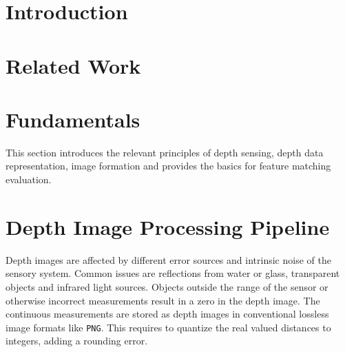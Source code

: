 \documentclass[numbers=noenddot,doktyp=marbeit,fontsize=12pt,sprache=english,hausschrift=true,draft=false]{TUBAFarbeiten}
\begin{document}
\maketitle
\TUBAFErklaerungsseite%

\setcounter{page}{1}

\newpage

\tableofcontents
\newpage



\newpage
{}\listoftables

\newpage
{}\listoffigures

\newpage
{}

\section{Introduction}\label{sec:introduction}

\newpage

\section{Related Work}\label{sec:related_work}

\newpage

\section{Fundamentals}\label{sec:fundamentals}

This section introduces the relevant principles of depth sensing, depth data representation, image formation and provides the basics for feature matching evaluation.






\newpage

\section{Depth Image Processing Pipeline}\label{sec:image_processing}

Depth images are affected by different error sources and intrinsic noise of the sensory system.
Common issues are reflections from water or glass, transparent objects and infrared light sources.
Objects outside the range of the sensor or otherwise incorrect measurements result in a zero in the depth image.
The continuous measurements are stored as depth images in conventional lossless image formats like \texttt{PNG}\cite{rfc2083_png}.
This requires to quantize the real valued distances to integers, adding a rounding error.
\end{document}
